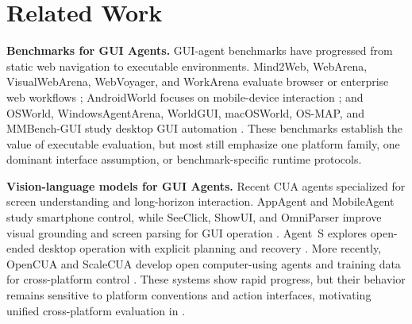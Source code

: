 \section{Related Work}

\noindent
\textbf{Benchmarks for GUI Agents.} 
GUI-agent benchmarks have progressed from static web navigation to executable environments. Mind2Web, WebArena, VisualWebArena, WebVoyager, and WorkArena evaluate browser or enterprise web workflows \citep{deng2023mind2web,zhou2023webarena,koh2024visualwebarena,he2024webvoyager,drouin2024workarena}; AndroidWorld focuses on mobile-device interaction \citep{rawles2024androidworld}; and OSWorld, WindowsAgentArena, WorldGUI, macOSWorld, OS-MAP, and MMBench-GUI study desktop GUI automation \citep{xie2024osworld,bonatti2024windows,zhao2025worldgui,yang2025macosworld,chen2025map,wang2025mmbench}. These benchmarks establish the value of executable evaluation, but most still emphasize one platform family, one dominant interface assumption, or benchmark-specific runtime protocols.

\noindent
\textbf{Vision-language models for GUI Agents.} 
Recent CUA agents specialized for screen understanding and long-horizon interaction. AppAgent and MobileAgent study smartphone control, while SeeClick, ShowUI, and OmniParser improve visual grounding and screen parsing for GUI operation \citep{zhang2025appagent,wang2024mobile,cheng2024seeclick,lin2025showui,lu2024omniparser}. Agent~S explores open-ended desktop operation with explicit planning and recovery \citep{agashe2024agent}. More recently, OpenCUA and ScaleCUA develop open computer-using agents and training data for cross-platform control \citep{wang2025opencua,liu2025scalecua}. These systems show rapid progress, but their behavior remains sensitive to platform conventions and action interfaces, motivating unified cross-platform evaluation in \dataset.

